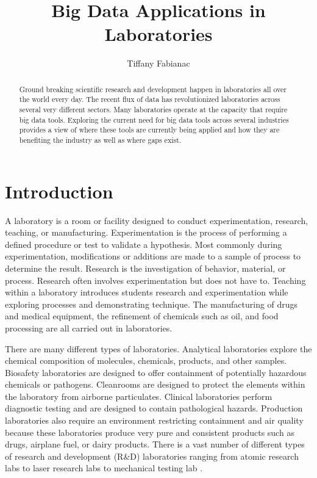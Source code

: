 \documentclass[sigconf]{acmart}
\begin{document}
\title{Big Data Applications  in Laboratories}

\author{Tiffany Fabianac} 
 \renewcommand{\shortauthors}{T. Fabianac} 

\begin{abstract}
Ground breaking scientific research and development happen in laboratories all over the world every day. The recent flux of data has revolutionized laboratories across several very different sectors. Many laboratories operate at the capacity that require big data tools. Exploring the current need for big data tools across several industries provides a view of where these tools are currently being applied and how they are benefiting the industry as well as where gaps exist.
\end{abstract}

\maketitle
\section{Introduction}
A laboratory is a room or facility designed to conduct experimentation, research, teaching, or manufacturing. Experimentation is the process of performing a defined procedure or test to validate a hypothesis. Most commonly during experimentation, modifications or additions are made to a sample of process to determine the result.  Research is the investigation of behavior, material, or process.  Research often involves experimentation but does not have to. Teaching within a laboratory introduces students research and experimentation while exploring processes and demonstrating technique. The manufacturing of drugs and medical equipment, the refinement of chemicals such as oil, and food processing are all carried out in laboratories.

There are many different types of laboratories. Analytical laboratories explore the chemical composition of molecules, chemicals, products, and other samples. Biosafety laboratories are designed to offer containment of potentially hazardous chemicals or pathogens. Cleanrooms are designed to protect the elements within the laboratory from airborne particulates. Clinical laboratories perform diagnostic testing and are designed to contain pathological hazards. Production laboratories also require an environment restricting containment and air quality because these laboratories produce very pure and consistent products such as drugs, airplane fuel, or dairy products. There is a vast number of different types of research and development (R\&D) laboratories ranging from atomic research labs to laser research labs to mechanical testing lab \cite{www-exilab}. 
\end{document}
